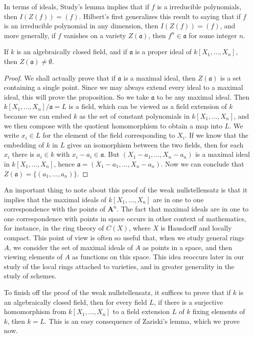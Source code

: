 In terms of ideals, Study's lemma implies that if $f$ is a irreducible polynomials, then $I(Z(f)) = (f)$. Hilbert's first generalizes this result to saying that if $f$ is an irreducible polynomial in any dimension, then $I(Z(f)) = (f)$, and more generally, if $f$ vanishes on a variety $Z(\mathfrak{a})$, then $f^n \in \mathfrak{a}$ for some integer $n$.

\begin{lemma}
    If $k$ is an algebraically closed field, and if $\mathfrak{a}$ is a proper ideal of $k[X_1, \dots, X_n]$, then $Z(\mathfrak{a}) \neq \emptyset$.
\end{lemma}
\begin{proof}
    We shall actually prove that if $\mathfrak{a}$ is a maximal ideal, then $Z(\mathfrak{a})$ is a set containing a single point. Since we may always extend every ideal to a maximal ideal, this will prove the proposition. So we take $\mathfrak{a}$ to be any maximal ideal. Then $k[X_1, \dots, X_n]/\mathfrak{a} = L$ is a field, which can be viewed as a field extension of $k$ because we can embed $k$ as the set of constant polynomials in $k[X_1, \dots, X_n]$, and we then compose with the quotient homomorphism to obtain a map into $L$. We write $x_i \in L$ for the element of the field corresponding to $X_i$. If we know that the embedding of $k$ in $L$ gives an isomorphism between the two fields, then for each $x_i$ there is $a_i \in k$ with $x_i - a_i \in \mathfrak{a}$. But $(X_1 - a_1, \dots, X_n - a_n)$ is a maximal ideal in $k[X_1, \dots, X_n]$, hence $\mathfrak{a} = (X_1 - a_1, \dots, X_n - a_n)$. Now we can conclude that $Z(\mathfrak{a}) = \{ (a_1, \dots, a_n) \}$.
\end{proof}

An important thing to note about this proof of the weak nullstellensatz is that it implies that the maximal ideals of $k[X_1, \dots, X_n]$ are in one to one correspondence with the points of $\mathbf{A}^n$. The fact that maximal ideals are in one to one correspondence with points in space occurs in other context of mathematics, for instance, in the ring theory of $C(X)$, where $X$ is Hausdorff and locally compact. This point of view is often so useful that, when we study general rings $A$, we consider the set of maximal ideals of $A$ as points in a space, and then viewing elements of $A$ as functions on this space. This idea reoccurs later in our study of the local rings attached to varieties, and in greater generality in the study of schemes.

To finish off the proof of the weak nullstellensatz, it suffices to prove that if $k$ is an algebraically closed field, then for every field $L$, if there is a surjective homomorphism from $k[X_1, \dots, X_n]$ to a field extension $L$ of $k$ fixing elements of $k$, then $k = L$. This is an easy consequence of Zariski's lemma, which we prove now.

